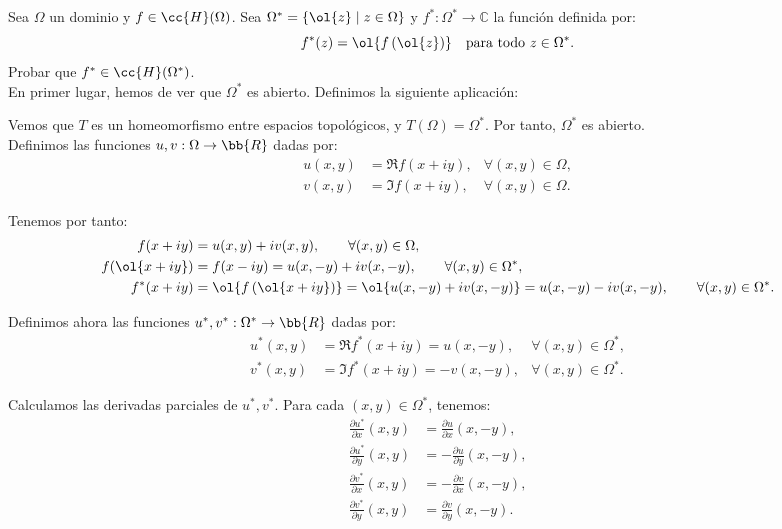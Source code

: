 \begin{ejercicio}
    Sea $\Omega$ un dominio y $f \in \cc{H}(\Omega)$. Sea $\Omega^* = \{\ol{z} \mid z \in \Omega\}$ y $f^* : \Omega^* \to \mathbb{C}$ la función definida por:
    \[
        f^*(z) = \ol{f\left(\ol{z}\right)} \quad \text{para todo } z \in \Omega^*.
    \]
    Probar que $f^* \in \cc{H}(\Omega^*)$.\\

    En primer lugar, hemos de ver que $\Omega^*$ es abierto. Definimos la siguiente aplicación:

    Vemos que $T$ es un homeomorfismo entre espacios topológicos, y $T(\Omega)=\Omega^*$. Por tanto, $\Omega^*$ es abierto.\\

    Definimos las funciones $u,v:\Omega\to\bb{R}$ dadas por:
    \begin{align*}
        u(x,y) &= \Re f(x+iy),&\forall (x,y)\in\Omega,\\
        v(x,y) &= \Im f(x+iy),&\forall (x,y)\in\Omega.
    \end{align*}

    Tenemos por tanto:
    \begin{align*}
        f(x+iy) &= u(x,y) + iv(x,y),\qquad \forall (x,y)\in\Omega,\\
        f(\ol{x+iy}) &= f(x-iy) = u(x,-y) + iv(x,-y),\qquad \forall (x,y)\in\Omega^*,\\
        f^*(x+iy) &= \ol{f\left(\ol{x+iy}\right)} = \ol{u(x,-y) + iv(x,-y)} = u(x,-y) - iv(x,-y),\qquad \forall (x,y)\in\Omega^*.
    \end{align*}

    Definimos ahora las funciones $u^*,v^*:\Omega^*\to\bb{R}$ dadas por:
    \begin{align*}
        u^*(x,y) &= \Re f^*(x+iy)=u(x,-y),&\forall (x,y)\in\Omega^*,\\
        v^*(x,y) &= \Im f^*(x+iy)=-v(x,-y),&\forall (x,y)\in\Omega^*.
    \end{align*}

    Calculamos las derivadas parciales de $u^*,v^*$. Para cada $(x,y)\in\Omega^*$, tenemos:
    \begin{align*}
        \frac{\partial u^*}{\partial x}(x,y) &= \frac{\partial u}{\partial x}(x,-y),\\
        \frac{\partial u^*}{\partial y}(x,y) &= -\frac{\partial u}{\partial y}(x,-y),\\
        \frac{\partial v^*}{\partial x}(x,y) &= -\frac{\partial v}{\partial x}(x,-y),\\
        \frac{\partial v^*}{\partial y}(x,y) &= \frac{\partial v}{\partial y}(x,-y).
    \end{align*}


\end{ejercicio}

